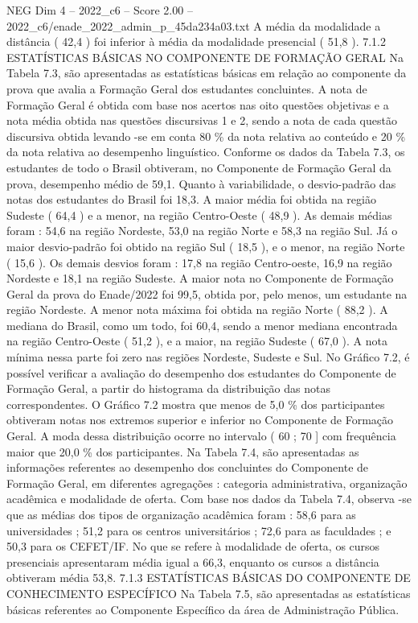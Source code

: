 \begin{textsample}{NEG Dim 4 – 2022\_c6 – Score 2.00 – 2022\_c6/enade\_2022\_admin\_p\_45da234a03.txt}
A média da modalidade a distância ( 42,4 ) foi inferior à média da modalidade presencial ( 51,8 ). 7.1.2 ESTATÍSTICAS BÁSICAS NO COMPONENTE DE FORMAÇÃO GERAL Na Tabela 7.3, são apresentadas as estatísticas básicas em relação ao componente da prova que avalia a Formação Geral dos estudantes concluintes.
A nota de Formação Geral é obtida com base nos acertos nas oito questões objetivas e a nota média obtida nas questões discursivas 1 e 2, sendo a nota de cada questão discursiva obtida levando -se em conta 80 \% da nota relativa ao conteúdo e 20 \% da nota relativa ao desempenho linguístico.
Conforme os dados da Tabela 7.3, os estudantes de todo o Brasil obtiveram, no Componente de Formação Geral da prova, desempenho médio de 59,1.
Quanto à variabilidade, o desvio-padrão das notas dos estudantes do Brasil foi 18,3.
A maior média foi obtida na região Sudeste ( 64,4 ) e a menor, na região Centro-Oeste ( 48,9 ).
As demais médias foram : 54,6 na região Nordeste, 53,0 na região Norte e 58,3 na região Sul.
Já o maior desvio-padrão foi obtido na região Sul ( 18,5 ), e o menor, na região Norte ( 15,6 ).
Os demais desvios foram : 17,8 na região Centro-oeste, 16,9 na região Nordeste e 18,1 na região Sudeste.
A maior nota no Componente de Formação Geral da prova do Enade/2022 foi 99,5, obtida por, pelo menos, um estudante na região Nordeste.
A menor nota máxima foi obtida na região Norte ( 88,2 ).
A mediana do Brasil, como um todo, foi 60,4, sendo a menor mediana encontrada na região Centro-Oeste ( 51,2 ), e a maior, na região Sudeste ( 67,0 ).
A nota mínima nessa parte foi zero nas regiões Nordeste, Sudeste e Sul.
No Gráfico 7.2, é possível verificar a avaliação do desempenho dos estudantes do Componente de Formação Geral, a partir do histograma da distribuição das notas correspondentes.
O Gráfico 7.2 mostra que menos de 5,0 \% dos participantes obtiveram notas nos extremos superior e inferior no Componente de Formação Geral.
A moda dessa distribuição ocorre no intervalo ( 60 ; 70 ] com frequência maior que 20,0 \% dos participantes.
Na Tabela 7.4, são apresentadas as informações referentes ao desempenho dos concluintes do Componente de Formação Geral, em diferentes agregações : categoria administrativa, organização acadêmica e modalidade de oferta.
Com base nos dados da Tabela 7.4, observa -se que as médias dos tipos de organização acadêmica foram : 58,6 para as universidades ; 51,2 para os centros universitários ; 72,6 para as faculdades ; e 50,3 para os CEFET/IF.
No que se refere à modalidade de oferta, os cursos presenciais apresentaram média igual a 66,3, enquanto os cursos a distância obtiveram média 53,8. 7.1.3 ESTATÍSTICAS BÁSICAS DO COMPONENTE DE CONHECIMENTO ESPECÍFICO Na Tabela 7.5, são apresentadas as estatísticas básicas referentes ao Componente Específico da área de Administração Pública.

\end{textsample}
